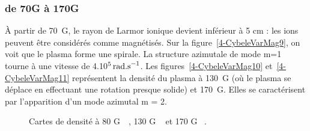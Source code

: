 \begin{refsection}
\subsubsection{de 70G à 170G}
À partir de 70~G, le rayon de Larmor ionique devient inférieur à 5 cm : les ions
peuvent être considérés comme magnétisés.
Sur la figure~\ref{4-CybeleVarMag9}, on voit que le
plasma forme une spirale. La structure azimutale de mode m=1 tourne à une
vitesse de 4.10$^{{5}}\,\text{rad.s}^{{-1}}$. Les
figures~\ref{4-CybeleVarMag10} et~\ref{4-CybeleVarMag11} représentent la densité
du plasma à 130~G (où le plasma se déplace en effectuant une rotation presque
solide) et 170~G. Elles se caractérisent par l'apparition d'un mode azimutal
m = 2.
\begin{figure}[!htbp]
  \centering
    \caption{Cartes de densité à 80 G~~, 130 G
    ~ et 170 G ~.}
    \label{4-CybeleVarMag-3}
\end{figure}


\end{refsection}
